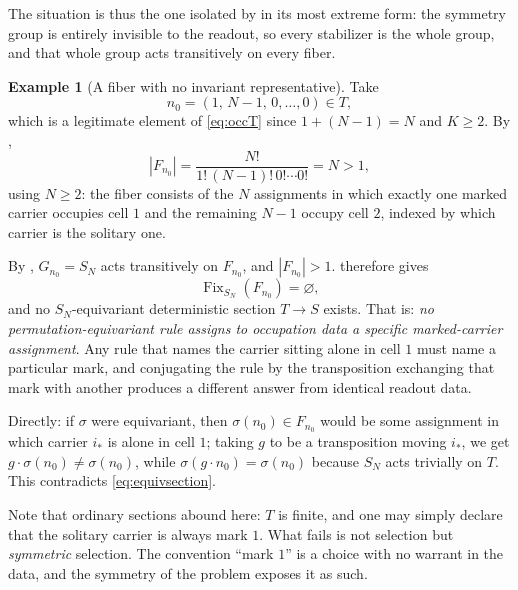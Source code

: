 \documentclass[11pt,reqno]{amsart}
\theoremstyle{plain}
\theoremstyle{definition}
\newtheorem{example}[theorem]{Example}
\theoremstyle{remark}
\DeclareMathOperator{\Fix}{Fix}
\begin{document}
The situation is thus the one isolated by  in its most extreme form: the symmetry group is entirely invisible to the readout, so every stabilizer is the whole group, and that whole group acts transitively on every fiber.

\begin{example}[A fiber with no invariant representative]
\label{ex:occ}
Take
\begin{equation}
\label{eq:n0}
n_{0}=(1,\,N-1,\,0,\ldots,0)\in T,
\end{equation}
which is a legitimate element of \eqref{eq:occT} since $1+(N-1)=N$ and $K\geq 2$. By ,
\begin{equation}
\label{eq:n0card}
|F_{n_{0}}|=\frac{N!}{1!\,(N-1)!\,0!\cdots 0!}=N>1,
\end{equation}
using $N\geq 2$: the fiber consists of the $N$ assignments in which exactly one marked carrier occupies cell $1$ and the remaining $N-1$ occupy cell $2$, indexed by which carrier is the solitary one.

By , $G_{n_{0}}=S_{N}$ acts transitively on $F_{n_{0}}$, and $|F_{n_{0}}|>1$.  therefore gives
\begin{equation}
\label{eq:occfixempty}
\Fix_{S_{N}}(F_{n_{0}})=\varnothing,
\end{equation}
and no $S_{N}$-equivariant deterministic section $T\to S$ exists. That is: \emph{no permutation-equivariant rule assigns to occupation data a specific marked-carrier assignment}. Any rule that names the carrier sitting alone in cell $1$ must name a particular mark, and conjugating the rule by the transposition exchanging that mark with another produces a different answer from identical readout data.

Directly: if $\sigma$ were equivariant, then $\sigma(n_{0})\in F_{n_{0}}$ would be some assignment in which carrier $i_{\ast}$ is alone in cell $1$; taking $g$ to be a transposition moving $i_{\ast}$, we get $g\cdot\sigma(n_{0})\neq\sigma(n_{0})$, while $\sigma(g\cdot n_{0})=\sigma(n_{0})$ because $S_{N}$ acts trivially on $T$. This contradicts \eqref{eq:equivsection}.
\end{example}

Note that ordinary sections abound here: $T$ is finite, and one may simply declare that the solitary carrier is always mark $1$. What fails is not selection but \emph{symmetric} selection. The convention ``mark $1$'' is a choice with no warrant in the data, and the symmetry of the problem exposes it as such.
\end{document}
